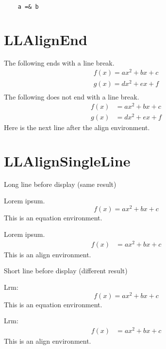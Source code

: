 \documentclass[a4paper]{article}
\newcommand{\tA}[1]{\textcolor{cA}{#1}}
\newcommand{\tD}[1]{\textcolor{cD}{#1}}
\begin{document}
\begin{verbatim}
	a =& b 
\end{verbatim}

\section{LLAlignEnd}

The following ends with a line break.
\begin{gather*}
	f(x) = ax^2 + bx + c \\
	g(x) = dx^2 + ex + f \\
\end{gather*}
The following does not end with a line break.
\begin{align*}
	f(x) & = ax^2 + bx + c \\
	g(x) & = dx^2 + ex + f
\end{align*}
Here is the next line after the align environment.

\section{LLAlignSingleLine}

\begin{itembox}{\large Long line before display (same result)}
	\begin{minipage}[t]{.5\columnwidth}
		Lorem ipsum.
		\begin{equation*}
			f(x) = ax^2 + bx + c
		\end{equation*}
		This is an \tA{equation} environment.
	\end{minipage}%
	\begin{minipage}[t]{.5\columnwidth}
		Lorem ipsum.
		\begin{align*}
			f(x) & = ax^2 + bx + c
		\end{align*}
		This is an \tD{align} environment.
	\end{minipage}
\end{itembox}

\vspace{\baselineskip}

\begin{itembox}{\large Short line before display (different result)}
	\begin{minipage}[t]{.5\columnwidth}
		Lrm:
		\begin{equation*}
			f(x) = ax^2 + bx + c
		\end{equation*}
		This is an \tA{equation} environment.
	\end{minipage}%
	\begin{minipage}[t]{.5\columnwidth}
		Lrm:
		\begin{align*}
			f(x) & = ax^2 + bx + c
		\end{align*}
		This is an \tD{align} environment.
	\end{minipage}
\end{itembox}
\end{document}
